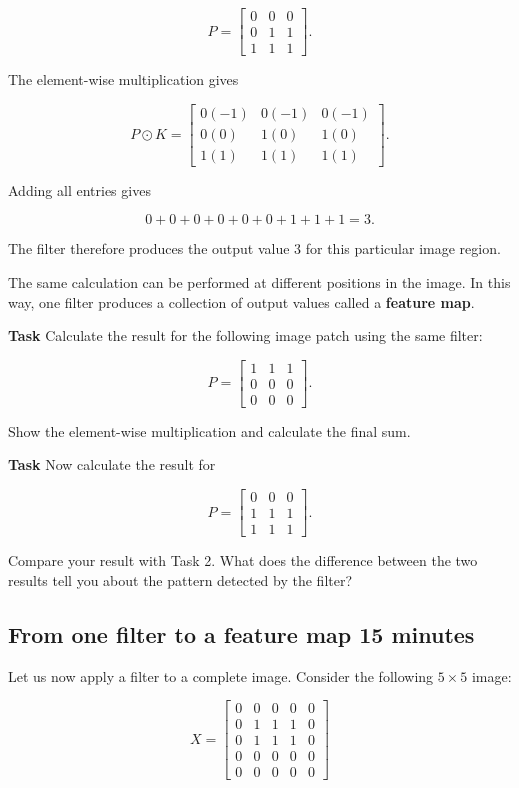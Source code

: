 \documentclass{course_sheet}
\begin{document}
\[
P =
\begin{bmatrix}
0 & 0 & 0\\
0 & 1 & 1\\
1 & 1 & 1
\end{bmatrix}.
\]

The element-wise multiplication gives

\[
P \odot K =
\begin{bmatrix}
0(-1) & 0(-1) & 0(-1)\\
0(0) & 1(0) & 1(0)\\
1(1) & 1(1) & 1(1)
\end{bmatrix}.
\]

Adding all entries gives

\[
0+0+0+0+0+0+1+1+1=3.
\]

The filter therefore produces the output value $3$ for this particular image region.

The same calculation can be performed at different positions in the image. In this way, one filter produces a collection of output values called a \textbf{feature map}.

\textbf{Task} Calculate the result for the following image patch using the same filter:

\[
P =
\begin{bmatrix}
1 & 1 & 1\\
0 & 0 & 0\\
0 & 0 & 0
\end{bmatrix}.
\]

Show the element-wise multiplication and calculate the final sum.

\textbf{Task} Now calculate the result for

\[
P =
\begin{bmatrix}
0 & 0 & 0\\
1 & 1 & 1\\
1 & 1 & 1
\end{bmatrix}.
\]

Compare your result with Task 2. What does the difference between the two results tell you about the pattern detected by the filter?

\subsection*{From one filter to a feature map \hfill 15 minutes}

Let us now apply a filter to a complete image. Consider the following $5 \times 5$ image:

\[
X =
\begin{bmatrix}
0 & 0 & 0 & 0 & 0\\
0 & 1 & 1 & 1 & 0\\
0 & 1 & 1 & 1 & 0\\
0 & 0 & 0 & 0 & 0\\
0 & 0 & 0 & 0 & 0
\end{bmatrix}
\]
\end{document}
